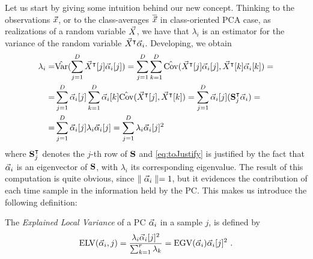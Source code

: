 %
Let us start by giving some intuition behind our new concept. Thinking to the observations ${\vec{x}}$, or to the class-averages ${\overline{\vec{x}}}$ in class-oriented PCA case, as realizations of a random variable $\vec{X}$, we have that $\lambda_i$ is an estimator for the variance of the random variable $\vec{X}^\intercal\vec{\alpha}_i$. Developing, we obtain
\begin{align}\label{eq:ELV}
\lambda_i =& \hat{\mathrm{Var}}(\sum_{j=1}^D \vec{X}^\intercal[j]\vec{\alpha}_i[j]) = \sum_{j=1}^D\sum_{k=1}^D \hat{\mathrm{Cov}}(\vec{X}^\intercal[j]\vec{\alpha}_i[j], \vec{X}^\intercal[k]\vec{\alpha}_i[k])=\\
=& \sum_{j=1}^D \vec{\alpha}_i[j]\sum_{k=1}^D\vec{\alpha}_i[k]\hat{\mathrm{Cov}}(\vec{X}^\intercal[j], \vec{X}^\intercal[k])= \sum_{j=1}^D \vec{\alpha}_i[j] (\textbf{S}_{j}^\intercal \vec{\alpha}_i)=  \\
=& \sum_{j=1}^D \vec{\alpha}_i[j] \lambda_i\vec{\alpha}_i[j]= \sum_{j=1}^D  \lambda_i \vec{\alpha}_i[j]^2 \label{eq:toJustify}
\end{align}
where $\textbf{S}_{j}^\intercal$ denotes the $j$-th row of $\textbf{S}$ and \eqref{eq:toJustify} is justified by the fact that $\vec{\alpha}_i$ is an eigenvector of $\textbf{S}$, with $\lambda_i$ its corresponding eigenvalue. The result of this computation is quite obvious, since $\parallel \vec{\alpha}_i\parallel=1$, but it evidences the contribution of each time sample in the information held by the PC. This makes us introduce the following definition:
\begin{definition}


The {\em Explained Local Variance} of a PC $\vec{\alpha}_i$ in a sample $j$, is defined by
\begin{equation}
\mathrm{ELV}(\vec{\alpha}_i,j) = \frac{\lambda_i \vec{\alpha}_i[j]^2}{\sum_{k=1}^r\lambda_k} = \mathrm{EGV}(\vec{\alpha}_i) \vec{\alpha}_i[j]^2  \mbox{ .}
\end{equation}
\end{definition}
